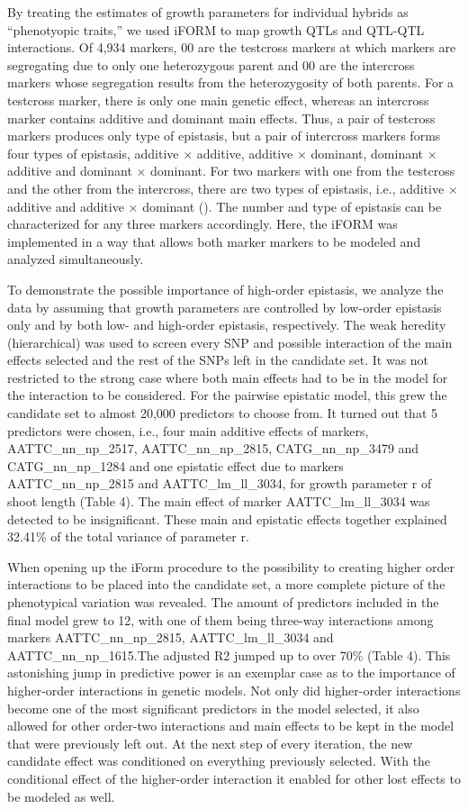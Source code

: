 \documentclass[]{book}
\theoremstyle{definition}
\theoremstyle{definition}
\theoremstyle{remark}
\begin{document}
By treating the estimates of growth parameters for individual hybrids as
``phenotyopic traits,'' we used iFORM to map growth QTLs and QTL-QTL
interactions. Of 4,934 markers, 00 are the testcross markers at which
markers are segregating due to only one heterozygous parent and 00 are
the intercross markers whose segregation results from the heterozygosity
of both parents. For a testcross marker, there is only one main genetic
effect, whereas an intercross marker contains additive and dominant main
effects. Thus, a pair of testcross markers produces only type of
epistasis, but a pair of intercross markers forms four types of
epistasis, additive × additive, additive × dominant, dominant × additive
and dominant × dominant. For two markers with one from the testcross and
the other from the intercross, there are two types of epistasis, i.e.,
additive × additive and additive × dominant (\cite{tong20113funmap}).
The number and type of epistasis can be characterized for any three
markers accordingly. Here, the iFORM was implemented in a way that
allows both marker markers to be modeled and analyzed simultaneously.

To demonstrate the possible importance of high-order epistasis, we
analyze the data by assuming that growth parameters are controlled by
low-order epistasis only and by both low- and high-order epistasis,
respectively. The weak heredity (hierarchical) was used to screen every
SNP and possible interaction of the main effects selected and the rest
of the SNPs left in the candidate set. It was not restricted to the
strong case where both main effects had to be in the model for the
interaction to be considered. For the pairwise epistatic model, this
grew the candidate set to almost 20,000 predictors to choose from. It
turned out that 5 predictors were chosen, i.e., four main additive
effects of markers, AATTC\_nn\_np\_2517, AATTC\_nn\_np\_2815,
CATG\_nn\_np\_3479 and CATG\_nn\_np\_1284 and one epistatic effect due
to markers AATTC\_nn\_np\_2815 and AATTC\_lm\_ll\_3034, for growth
parameter r of shoot length (Table 4). The main effect of marker
AATTC\_lm\_ll\_3034 was detected to be insignificant. These main and
epistatic effects together explained 32.41\% of the total variance of
parameter r.

When opening up the iForm procedure to the possibility to creating
higher order interactions to be placed into the candidate set, a more
complete picture of the phenotypical variation was revealed. The amount
of predictors included in the final model grew to 12, with one of them
being three-way interactions among markers AATTC\_nn\_np\_2815,
AATTC\_lm\_ll\_3034 and AATTC\_nn\_np\_1615.The adjusted R2 jumped up to
over 70\% (Table 4). This astonishing jump in predictive power is an
exemplar case as to the importance of higher-order interactions in
genetic models. Not only did higher-order interactions become one of the
most significant predictors in the model selected, it also allowed for
other order-two interactions and main effects to be kept in the model
that were previously left out. At the next step of every iteration, the
new candidate effect was conditioned on everything previously selected.
With the conditional effect of the higher-order interaction it enabled
for other lost effects to be modeled as well.
\end{document}
